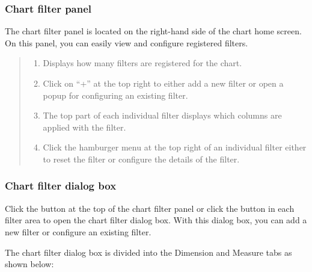 \documentclass[letterpaper,10pt,english]{sphinxmanual}
\begin{document}
\subsubsection{Chart filter panel}
\label{\detokenize{discovery/part04/chart_filter:id3}}
The chart filter panel is located on the right-hand side of the chart home screen. On this panel, you can easily view and configure registered filters.
\begin{quote}

\begin{figure}[H]
\centering

\noindent{}
\end{figure}
\begin{enumerate}
\def\theenumi{\arabic{enumi}}
\def\labelenumi{\theenumi .}
\makeatletter\def\p@enumii{\p@enumi \theenumi .}\makeatother
\item {} 
 Displays how many filters are registered for the chart.

\item {} 
 Click on “+” at the top right to either add a new filter or open a popup for configuring an existing filter.

\item {} 
 The top part of each individual filter displays which columns are applied with the filter.

\item {} 
 Click the hamburger menu at the top right of an individual filter either to reset the filter or configure the details of the filter.

\end{enumerate}
\end{quote}


\subsubsection{Chart filter dialog box}
\label{\detokenize{discovery/part04/chart_filter:id4}}
Click the button at the top of the chart filter panel or click the button in each filter area to open the chart filter dialog box. With this dialog box, you can add a new filter or configure an existing filter.

The chart filter dialog box is divided into the Dimension and Measure tabs as shown below:
\begin{quote}

\begin{figure}[H]
\centering

\noindent{}
\end{figure}
\end{quote}
\end{document}
